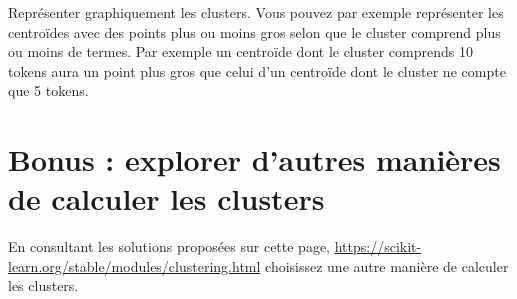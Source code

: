 Représenter graphiquement les clusters. Vous pouvez par exemple représenter les centroïdes avec des points plus ou moins gros selon que le cluster comprend plus ou moins de termes. Par exemple un centroïde dont le cluster comprends 10 tokens aura un point plus gros que celui d'un centroïde dont le cluster ne compte que 5 tokens.

\section{Bonus : explorer d'autres manières de calculer les clusters}
 \label{sec:bonus}

En consultant les solutions proposées sur cette page,
\url{https://scikit-learn.org/stable/modules/clustering.html} choisissez une autre manière de calculer les clusters.

%
%
%
% 
%
%
%
%

\begin{center}

\noindent{}
	\end{center}

